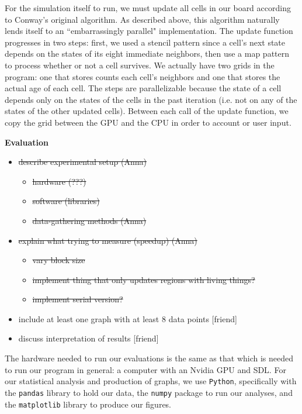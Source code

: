 \documentclass[12pt]{article}
\newcommand{\mybegit}{\vspace{-2mm} \begin{itemize} \itemsep-.6em }
\newcommand{\mytitle}[1]{\vspace{10mm} \noindent\begin{large} \textbf{{#1}} \end{large}}
\newcommand{\soutt}[1]{%
    \renewcommand{\ULthickness}{1.0pt}%
       \sout{#1}%
    \renewcommand{\ULthickness}{.4pt}%
}
\begin{document}
	For the simulation itself to run, we must update all cells in our board according to Conway's original algorithm. As described above, this algorithm naturally lends itself to an ``embarrassingly parallel" implementation. The update function progresses in two steps: first, we used a stencil pattern since a cell's next state depends on the states of its eight immediate neighbors, then use a map pattern to process whether or not a cell survives. We actually have two grids in the program: one that stores counts each cell's neighbors and one that stores the actual age of each cell. The steps are parallelizable because the state of a cell depends only on the states of the cells in the past iteration (i.e. not on any of the states of the other updated cells). Between each call of the update function, we copy the grid between the GPU and the CPU in order to account or user input.

	




\mytitle{Evaluation}


\mybegit
	\item \soutt{describe experimental setup (Anna)}
		\mybegit
			\item \soutt{hardware (???)}
			\item \soutt{software (libraries)}
			\item \soutt{data-gathering methods (Anna)}
		\end{itemize}
	\item \soutt{ explain what trying to measure (speedup)  (Anna)}
		\mybegit
			\item \soutt{vary block size}
			\item \soutt{implement thing that only updates regions with living things?}
			\item \soutt{implement serial version?}
		\end{itemize}
	\item include at least one graph with at least 8 data points [friend]
	\item discuss interpretation of results [friend]	
\end{itemize}

    The hardware needed to run our evaluations is the same as that which is needed to run our program in general: a computer with an Nvidia GPU and SDL. For our statistical analysis and production of graphs, we use \texttt{Python}, specifically with the \texttt{pandas} library to hold our data, the \texttt{numpy} package to run our analyses, and the \texttt{matplotlib} library to produce our figures.  
\end{document}
